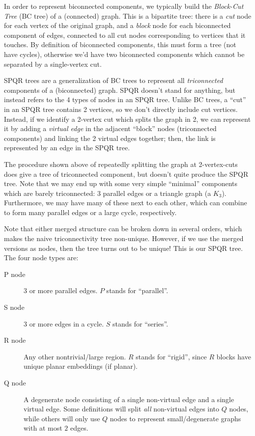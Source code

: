 \documentclass[letterpaper]{article}
\begin{document}
In order to represent biconnected components, we typically build the
\emph{Block-Cut Tree} (BC tree) of a (connected) graph. This is a bipartite tree: there is a
\emph{cut} node for each vertex of the original graph, and a \emph{block} node
for each biconnected component of edges, connected to all cut nodes
corresponding to vertices that it touches. By definition of biconnected
components, this must form a tree (not have cycles), otherwise we'd have two
biconnected components which cannot be separated by a single-vertex cut.

SPQR trees are a generalization of BC trees to represent all \emph{triconnected}
components of a (biconnected) graph. SPQR doesn't stand for anything, but
instead refers to the 4 types of nodes in an SPQR tree. Unlike BC trees, a
``cut'' in an SPQR tree contains 2 vertices, so we don't directly include cut
vertices. Instead, if we identify a 2-vertex cut which splits the graph in 2, we
can represent it by adding a \emph{virtual edge} in the adjacent ``block'' nodes
(triconnected components) and linking the 2 virtual edges together; then, the
link is represented by an edge in the SPQR tree.


The procedure shown above of repeatedly splitting the graph at 2-vertex-cuts
does give a tree of triconnected component, but doesn't quite produce the SPQR
tree. Note that we may end up with some very simple ``minimal'' components which
are barely triconnected: 3 parallel edges or a triangle graph (a $K_3$).
Furthermore, we may have many of these next to each other, which can combine to
form many parallel edges or a large cycle, respectively. 

Note that either merged structure can be broken down in several orders, which
makes the naive triconnectivity tree non-unique. However, if we use the merged
versions as nodes, then the tree turns out to be unique!  This is
our SPQR tree. The four node types are:
\begin{description}
	\item[P node] 3 or more parallel edges. $P$ stands for ``parallel''.
	\item[S node] 3 or more edges in a cycle. $S$ stands for ``series''.
	\item[R node] Any other nontrivial/large region. $R$ stands for ``rigid'',
		since $R$ blocks have unique planar embeddings (if planar).
	\item[Q node] A degenerate node consisting of a single non-virtual edge and
		a single virtual edge. Some definitions will split \emph{all}
		non-virtual edges into $Q$ nodes, while others will only use $Q$ nodes
		to represent small/degenerate graphs with at most $2$ edges.
\end{description}
\end{document}
